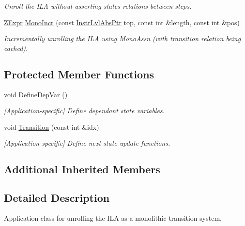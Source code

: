 \begin{DoxyCompactItemize}
\begin{DoxyCompactList}\small\item\em Unroll the I\+LA without asserting states relations between steps. \end{DoxyCompactList}\item 
\mbox{\hyperlink{classilang_1_1_unroller_a9fd0359e3ffd666f8f92ad3c3ef52673}{Z\+Expr}} \mbox{\hyperlink{classilang_1_1_mono_unroll_a5c27f29015b8cc01cca14f9ff65a8bbd}{Mono\+Incr}} (const \mbox{\hyperlink{namespaceilang_ad1b30fdf347e493b3937143da05d1a72}{Instr\+Lvl\+Abs\+Ptr}} top, const int \&length, const int \&pos)
\begin{DoxyCompactList}\small\item\em Incrementally unrolling the I\+LA using Mono\+Assn (with transition relation being cached). \end{DoxyCompactList}\end{DoxyCompactItemize}
\subsection*{Protected Member Functions}
\begin{DoxyCompactItemize}
\item 
void \mbox{\hyperlink{classilang_1_1_mono_unroll_ab983b89c775ba2d12b5a763ac3391c93}{Define\+Dep\+Var}} ()
\begin{DoxyCompactList}\small\item\em \mbox{[}Application-\/specific\mbox{]} Define dependant state variables. \end{DoxyCompactList}\item 
void \mbox{\hyperlink{classilang_1_1_mono_unroll_a877b2706be77213a5a5f7b50629ba07c}{Transition}} (const int \&idx)
\begin{DoxyCompactList}\small\item\em \mbox{[}Application-\/specific\mbox{]} Define next state update functions. \end{DoxyCompactList}\end{DoxyCompactItemize}
\subsection*{Additional Inherited Members}


\subsection{Detailed Description}
Application class for unrolling the I\+LA as a monolithic transition system. 

